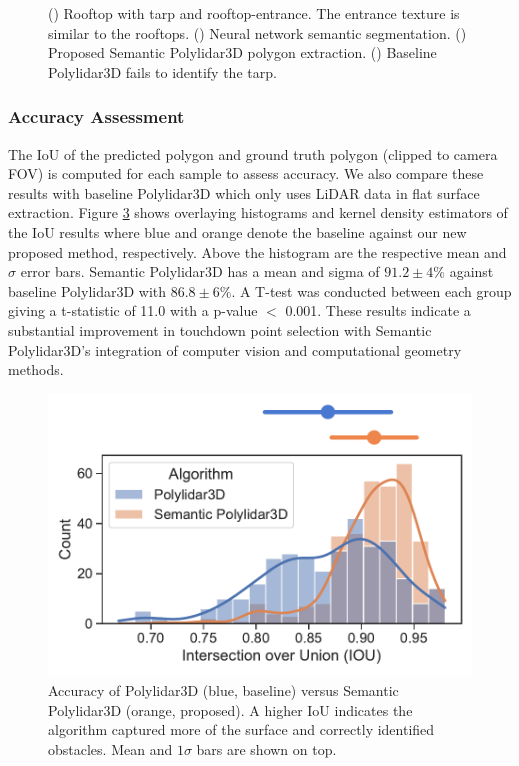 \begin{figure}[ht]
\begin{subfigure}{.25\columnwidth}
    \caption{\label{fig:ch6_case1_e}}
  \end{subfigure}
  \caption[Example of Semantic Polylidar3D on a challenging rooftop]{ () Rooftop with tarp and rooftop-entrance. The entrance texture is similar to the rooftops.  () Neural network semantic segmentation. 
   () Proposed Semantic Polylidar3D polygon extraction. () Baseline Polylidar3D fails to identify the tarp. }\label{fig:ch6_case1}
\end{figure}


\subsubsection{Accuracy Assessment}

The IoU of the predicted polygon and ground truth polygon (clipped to camera FOV) is computed for each sample to assess accuracy. We also compare these results with baseline Polylidar3D which only uses LiDAR data in flat surface extraction. Figure \ref{fig:ch6_compare_algs} shows overlaying histograms and kernel density estimators of the IoU results where blue and orange denote the baseline against our new proposed method, respectively. Above the histogram are the respective mean and $\sigma$ error bars. Semantic Polylidar3D has a mean and sigma of $91.2 \pm 4\%$ against baseline Polylidar3D with $86.8 \pm 6\%$. A T-test was conducted between each group giving a t-statistic of 11.0 with a p-value $<$ 0.001. These results indicate a substantial improvement in touchdown point selection with Semantic Polylidar3D's integration of computer vision and computational geometry methods. 


\begin{figure}[ht!]
\centering
\includegraphics[width=.55\linewidth]{chapter_6_landingsim/figs/compare_algs_extra_2.pdf}
\caption[Accuracy benchmark for Semantic Polylidar3D]{Accuracy of Polylidar3D (blue, baseline) versus Semantic Polylidar3D (orange, proposed). A higher IoU indicates the algorithm captured more of the surface and correctly identified obstacles. Mean and $1\sigma$ bars are shown on top.}
\label{fig:ch6_compare_algs}
\end{figure}

